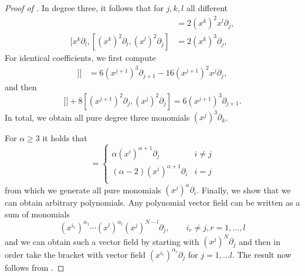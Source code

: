 \documentclass[10pt]{amsart}
\theoremstyle{remark}
\numberwithin{equation}{section}
\begin{document}
\begin{proof}[Proof of ]
In degree three, it follows that for $j,k,l$ all different
\begin{align}
[(x^k)^2\partial_l, (x^l)^2 \partial_j] &= 2(x^k)^2 x^l \partial_j ,\\
[x^k \partial_l, [(x^k)^2\partial_l, (x^l)^2 \partial_j] &= 2(x^k)^3 \partial_j,
\end{align}
For identical coefficients, we first compute
\begin{align}
[x^{j+1}\partial_j, [x^{j+1}\partial_j, [x^{j+1}\partial_j, Y]]] &= 6(x^{j+1})^3 \partial_{j+1} - 16(x^{j+1})^2 x^j \partial_j,
\end{align}
and then
\begin{equation}
[x^{j+1}\partial_j, [x^{j+1}\partial_j, [x^{j+1}\partial_j, Y]]] + 8 [(x^{j+1})^2\partial_j, (x^j)^2 \partial_j] = 6(x^{j+1})^3 \partial_{j+1}.
\end{equation}
In total, we obtain all pure degree three monomials $(x^j)^3 \partial_k$.

For $\alpha \geq 3$ it holds that
\begin{equation}
[(x^i)^2\partial_i, (x^i)^\alpha \partial_j] = \begin{cases}
\alpha(x^i)^{\alpha+1} \partial_j & i \neq j \\
(\alpha-2)(x^i)^{\alpha+1} \partial_i & i = j \\
\end{cases}
\end{equation}
from which we generate all pure monomials $(x^j)^\alpha \partial_i$. Finally, we show that we can obtain arbitrary polynomials. Any polynomial vector field can be written as a sum of monomials
$$(x^{i_1})^{\alpha_1} \cdots (x^{l})^{\alpha_l} (x^j)^{N - l} \partial_j, \qquad i_r \neq j, r=1, \dots, l$$
and we can obtain such a vector field by starting with $(x^j)^N \partial_j$ and then in order take the bracket with vector field $(x^{i_r})^{\alpha_r} \partial_j$ for $j=1, \dots l$. The result now follows from .
\end{proof}








\end{document}
